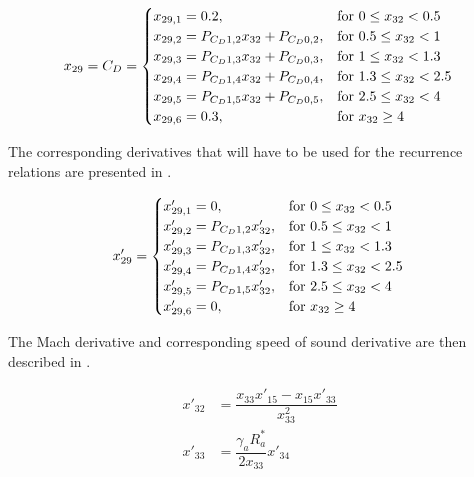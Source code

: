 \begin{equation}\label{eq:cdCond}
x_{29}=C_{D}=\begin{cases}
x_{29,1}=0.2, & \text{for } 0\leq x_{32} < 0.5\\
x_{29,2}=P_{C_{D} 1,2}x_{32}+P_{C_{D} 0,2}, &  \text{for } 0.5\leq x_{32} < 1 \\
x_{29,3}=P_{C_{D} 1,3}x_{32}+P_{C_{D} 0,3}, &  \text{for } 1\leq x_{32} < 1.3 \\
x_{29,4}=P_{C_{D} 1,4}x_{32}+P_{C_{D} 0,4}, &  \text{for } 1.3\leq x_{32} < 2.5 \\
x_{29,5}=P_{C_{D} 1,5}x_{32}+P_{C_{D} 0,5}, &  \text{for } 2.5\leq x_{32} < 4 \\
x_{29,6}=0.3, &  \text{for } x_{32} \geq 4 
\end{cases}\\
\end{equation}

\noindent
The corresponding derivatives that will have to be used for the recurrence relations are presented in .

\begin{equation}\label{eq:cdCondDer}
x'_{29}=\begin{cases}
x'_{29,1}=0, & \text{for } 0\leq x_{32} < 0.5\\
x'_{29,2}=P_{C_{D} 1,2}x'_{32}, &  \text{for } 0.5\leq x_{32} < 1 \\
x'_{29,3}=P_{C_{D} 1,3}x'_{32}, &  \text{for } 1\leq x_{32} < 1.3 \\
x'_{29,4}=P_{C_{D} 1,4}x'_{32}, &  \text{for } 1.3\leq x_{32} < 2.5 \\
x'_{29,5}=P_{C_{D} 1,5}x'_{32}, &  \text{for } 2.5\leq x_{32} < 4 \\
x'_{29,6}=0, &  \text{for } x_{32} \geq 4 
\end{cases}\\
\end{equation}

\noindent
The Mach derivative and corresponding speed of sound derivative are then described in .

 \begin{equation} \label{eq:cdDerAux}
\begin{split}
x'_{32} &= \dfrac{x_{33}x'_{15}-x_{15}x'_{33}}{x_{33}^{2}}\\
x'_{33} &= \dfrac{\gamma_{a}R_{a}^{*}}{2x_{33}}x'_{34} 
\end{split}
\end{equation}

